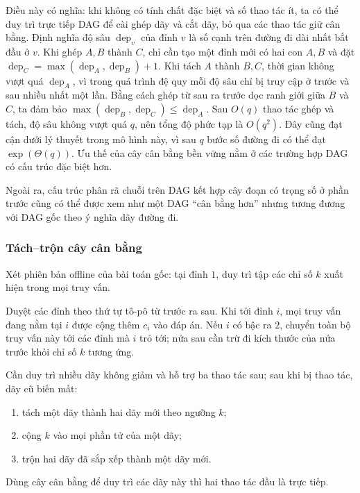 \documentclass[11pt]{article}
\begin{document}
Điều này có nghĩa: khi không có tính chất đặc biệt và số thao tác ít, ta có thể
duy trì trực tiếp DAG để cài ghép dãy và cắt dãy, bỏ qua các thao tác giữ cân
bằng. Định nghĩa độ sâu $\operatorname{dep}_v$ của đỉnh $v$ là số cạnh trên
đường đi dài nhất bắt đầu ở $v$. Khi ghép $A,B$ thành $C$, chỉ cần tạo một đỉnh
mới có hai con $A,B$ và đặt
$\operatorname{dep}_C=\max(\operatorname{dep}_A,\operatorname{dep}_B)+1$.
Khi tách $A$ thành $B,C$, thời gian không vượt quá $\operatorname{dep}_A$, vì
trong quá trình đệ quy mỗi độ sâu chỉ bị truy cập ở trước và sau nhiều nhất một
lần. Bằng cách ghép từ sau ra trước dọc ranh giới giữa $B$ và $C$, ta đảm bảo
$\max(\operatorname{dep}_B,\operatorname{dep}_C)\le \operatorname{dep}_A$.
Sau $O(q)$ thao tác ghép và tách, độ sâu không vượt quá $q$, nên tổng độ phức tạp
là $O(q^2)$. Đây cũng đạt cận dưới lý thuyết trong mô hình này, vì sau $q$ bước
số đường đi có thể đạt $\exp(\Theta(q))$. Ưu thế của cây cân bằng bền vững nằm ở
các trường hợp DAG có cấu trúc đặc biệt hơn.

Ngoài ra, cấu trúc phân rã chuỗi trên DAG kết hợp cây đoạn có trọng số ở phần
trước cũng có thể được xem như một DAG ``cân bằng hơn'' nhưng tương đương với
DAG gốc theo ý nghĩa dãy đường đi.

\subsubsection{Tách--trộn cây cân bằng}

Xét phiên bản offline của bài toán gốc: tại đỉnh $1$, duy trì tập các chỉ số
$k$ xuất hiện trong mọi truy vấn.

Duyệt các đỉnh theo thứ tự tô-pô từ trước ra sau. Khi tới đỉnh $i$, mọi truy vấn
đang nằm tại $i$ được cộng thêm $c_i$ vào đáp án. Nếu $i$ có bậc ra $2$, chuyển
toàn bộ truy vấn này tới các đỉnh mà $i$ trỏ tới; nửa sau cần trừ đi kích thước
của nửa trước khỏi chỉ số $k$ tương ứng.

Cần duy trì nhiều dãy không giảm và hỗ trợ ba thao tác sau; sau khi bị thao tác,
dãy cũ biến mất:
\begin{enumerate}
  \item tách một dãy thành hai dãy mới theo ngưỡng $k$;
  \item cộng $k$ vào mọi phần tử của một dãy;
  \item trộn hai dãy đã sắp xếp thành một dãy mới.
\end{enumerate}

Dùng cây cân bằng để duy trì các dãy này thì hai thao tác đầu là trực tiếp.
\end{document}
